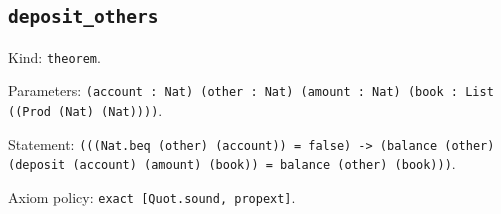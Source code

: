 \documentclass[11pt]{article}
\begin{document}
\subsection*{\texttt{deposit\_others}}
\noindent Kind: \texttt{theorem}.\par
\noindent Parameters: \texttt{(account : Nat) (other : Nat) (amount : Nat) (book : List ((Prod (Nat) (Nat))))}.\par
\noindent Statement: \texttt{(((Nat.beq (other) (account)) = false) -> (balance (other) (deposit (account) (amount) (book)) = balance (other) (book)))}.\par
\noindent Axiom policy: \texttt{exact [Quot.sound, propext]}.\par
\end{document}
